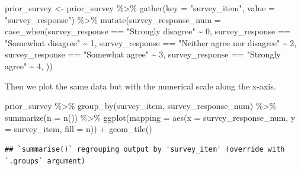 \documentclass[
]{book}
\newenvironment{Shaded}{\begin{snugshade}}{\end{snugshade}}
\newcommand{\AttributeTok}[1]{\textcolor[rgb]{0.77,0.63,0.00}{#1}}
\newcommand{\DecValTok}[1]{\textcolor[rgb]{0.00,0.00,0.81}{#1}}
\newcommand{\FunctionTok}[1]{\textcolor[rgb]{0.00,0.00,0.00}{#1}}
\newcommand{\NormalTok}[1]{#1}
\newcommand{\OtherTok}[1]{\textcolor[rgb]{0.56,0.35,0.01}{#1}}
\newcommand{\SpecialCharTok}[1]{\textcolor[rgb]{0.00,0.00,0.00}{#1}}
\newcommand{\StringTok}[1]{\textcolor[rgb]{0.31,0.60,0.02}{#1}}
\begin{document}
\begin{Shaded}
\begin{Highlighting}[]
\NormalTok{prior\_survey }\OtherTok{\textless{}{-}}\NormalTok{ prior\_survey }\SpecialCharTok{\%\textgreater{}\%} 
  \FunctionTok{gather}\NormalTok{(}\AttributeTok{key =} \StringTok{"survey\_item"}\NormalTok{, }\AttributeTok{value =} \StringTok{"survey\_response"}\NormalTok{) }\SpecialCharTok{\%\textgreater{}\%} 
  \FunctionTok{mutate}\NormalTok{(}\AttributeTok{survey\_response\_num =} \FunctionTok{case\_when}\NormalTok{(survey\_response }\SpecialCharTok{==} \StringTok{"Strongly disagree"} \SpecialCharTok{\textasciitilde{}} \DecValTok{0}\NormalTok{,}
\NormalTok{                                         survey\_response }\SpecialCharTok{==} \StringTok{"Somewhat disagree"} \SpecialCharTok{\textasciitilde{}} \DecValTok{1}\NormalTok{,}
\NormalTok{                                         survey\_response }\SpecialCharTok{==} \StringTok{"Neither agree nor disagree"} \SpecialCharTok{\textasciitilde{}} \DecValTok{2}\NormalTok{,}
\NormalTok{                                         survey\_response }\SpecialCharTok{==} \StringTok{"Somewhat agree"} \SpecialCharTok{\textasciitilde{}} \DecValTok{3}\NormalTok{,}
\NormalTok{                                         survey\_response }\SpecialCharTok{==} \StringTok{"Strongly agree"} \SpecialCharTok{\textasciitilde{}} \DecValTok{4}\NormalTok{,}
\NormalTok{                                         )) }
\end{Highlighting}
\end{Shaded}

Then we plot the same data but with the numerical scale along the x-axis.

\begin{Shaded}
\begin{Highlighting}[]
\NormalTok{prior\_survey }\SpecialCharTok{\%\textgreater{}\%} 
  \FunctionTok{group\_by}\NormalTok{(survey\_item, survey\_response\_num) }\SpecialCharTok{\%\textgreater{}\%} 
  \FunctionTok{summarize}\NormalTok{(}\AttributeTok{n =} \FunctionTok{n}\NormalTok{()) }\SpecialCharTok{\%\textgreater{}\%} 
  \FunctionTok{ggplot}\NormalTok{(}\AttributeTok{mapping =} \FunctionTok{aes}\NormalTok{(}\AttributeTok{x =}\NormalTok{ survey\_response\_num, }\AttributeTok{y =}\NormalTok{ survey\_item, }\AttributeTok{fill =}\NormalTok{ n)) }\SpecialCharTok{+}
  \FunctionTok{geom\_tile}\NormalTok{()}
\end{Highlighting}
\end{Shaded}

\begin{verbatim}
## `summarise()` regrouping output by 'survey_item' (override with `.groups` argument)
\end{verbatim}
\end{document}
